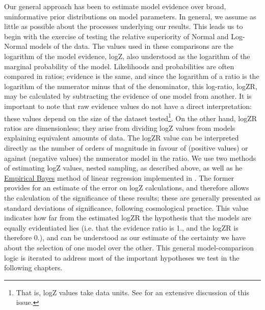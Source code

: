 Our general approach has been to estimate model evidence over broad, uninformative prior distributions on model parameters. In general, we assume as little as possible about the processes underlying our results. This leads us to begin with the exercise of testing the relative superiority of Normal and Log-Normal models of the data. The values used in these comparisons are the logarithm of the model evidence, logZ, also understood as the logarithm of the marginal probability of the model. Likelihoods and probabilities are often compared in ratios; evidence is the same, and since the logarithm of a ratio is the logarithm of the numerator minus that of the denominator, this log-ratio, logZR, may be calculated by subtracting the evidence of one model from another. It is important to note that raw evidence values do not have a direct interpretation: these values depend on the size of the dataset tested\footnote{That is, logZ values take data units. See \cite{Skilling2012} for an extensive discussion of this issue.}. On the other hand, logZR ratios are dimensionless; they arise from dividing logZ values from models explaining equivalent amounts of data. The logZR value can be interpreted directly as the number of orders of magnitude in favour of (positive values) or against (negative values) the numerator model in the ratio. We use two methods of estimating logZ values, nested sampling, as described above, as well as he \hyperref[ssec:EmpiricalBayes]{Empirical Bayes} method of linear regression implemented in . The former provides for an estimate of the error on logZ calculations, and therefore allows the calculation of the significance of these results; these are generally presented as standard deviations of significance, following cosmological practice. This value indicates how far from the estimated logZR the hypothesis that the models are equally evidentiated lies (i.e. that the evidence ratio is 1., and the logZR is therefore 0.), and can be understood as our estimate of the certainty we have about the selection of one model over the other. This general model-comparison logic is iterated to address most of the important hypotheses we test in the following chapters.